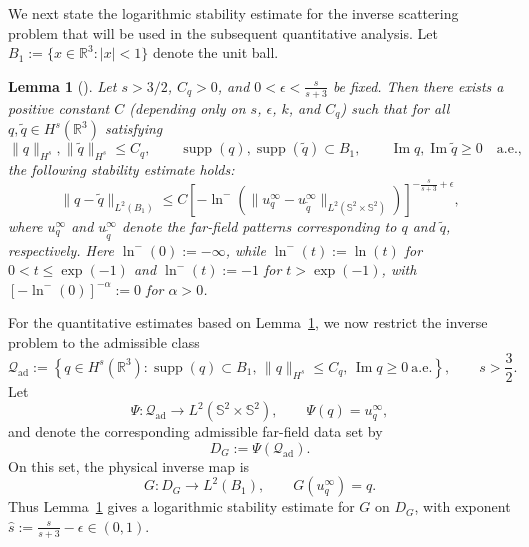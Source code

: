\documentclass{article}
\numberwithin{equation}{section}
\theoremstyle{plain}
\newtheorem{lemma}{Lemma}[section]
\begin{document}
	We next state the logarithmic stability estimate for the inverse scattering problem that will be used in the subsequent quantitative analysis. Let $B_1:=\{x\in\mathbb R^3:|x|<1\}$ denote the unit ball.
	\begin{lemma}[\cite{HH01}]\label{lem:ln}
		Let $s>3/2$, $C_q>0$, and
		$0<\epsilon<\frac{s}{s+3}$ be fixed. Then there exists a positive constant $C$ (depending only on $s$, $\epsilon$, $k$, and $C_q$) such that for all
		$q,\widetilde q\in H^s(\mathbb R^3)$ satisfying
		\begin{equation*}
			\|q\|_{H^s},\|\widetilde q\|_{H^s}\le C_q,
			\qquad
			\operatorname{supp}(q),\operatorname{supp}(\widetilde q)\subset B_1,
			\qquad
			\operatorname{Im}q,\operatorname{Im}\widetilde q\ge0
			\quad\text{a.e.},
		\end{equation*}
		the following stability estimate holds:
		\begin{equation*}
		\|q - \widetilde{q}\|_{L^2(B_1)} \leq C \left[ -\ln^{-} \left( \|u_q^\infty - u_{\widetilde{q}}^\infty\|_{L^2(\mathbb{S}^2 \times \mathbb{S}^2)} \right) \right]^{-\frac{s}{s+3} + \epsilon},
		\end{equation*}
		where $u_q^\infty$ and $u_{\widetilde{q}}^\infty$ denote the far-field patterns corresponding to $q$ and $\widetilde{q}$, respectively. Here $\ln^{-}(0):=-\infty$, while $\ln^{-}(t):=\ln(t)$ for $0<t\leq\exp(-1)$ and $\ln^{-}(t):=-1$ for $t>\exp(-1)$, with $[-\ln^{-}(0)]^{-\alpha}:=0$ for $\alpha>0$.
	\end{lemma}
	
	For the quantitative estimates based on Lemma~\ref{lem:ln}, we now restrict the inverse problem to the admissible class
	\begin{equation*}
		\mathcal Q_{\mathrm{ad}}
		:=
		\left\{
		q\in H^s(\mathbb R^3):
		\operatorname{supp}(q)\subset B_1,\,
		\|q\|_{H^s}\le C_q,\,
		\operatorname{Im}q\ge0\ \text{a.e.}
		\right\},
		\qquad s>\frac32.
	\end{equation*}
	Let
	\begin{equation*}
	\Psi:\mathcal Q_{\mathrm{ad}}\to L^2(\mathbb S^2\times\mathbb S^2),
	\qquad
	\Psi(q)=u_q^\infty,
    \end{equation*}
	and denote the corresponding admissible far-field data set by
	\begin{equation*}
	D_G:=\Psi(\mathcal Q_{\mathrm{ad}}).
	\end{equation*}
	On this set, the physical inverse map is
	\begin{equation*}
	G:D_G\to L^2(B_1),
	\qquad
	G(u_q^\infty)=q .
	\end{equation*}
	Thus Lemma~\ref{lem:ln} gives a logarithmic stability estimate for $G$ on $D_G$, with exponent $\hat s:=\frac{s}{s+3}-\epsilon \in (0,1)$.
	
\end{document}
